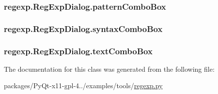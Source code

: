 \subsubsection[{pattern\+Combo\+Box}]{\setlength{\rightskip}{0pt plus 5cm}regexp.\+Reg\+Exp\+Dialog.\+pattern\+Combo\+Box}\label{classregexp_1_1RegExpDialog_a50d7f5a4ded544a783e2c38ad4d79d31}
\hypertarget{classregexp_1_1RegExpDialog_a79e05ca94ff124c94d55e2bb5cc48657}{}
\subsubsection[{syntax\+Combo\+Box}]{\setlength{\rightskip}{0pt plus 5cm}regexp.\+Reg\+Exp\+Dialog.\+syntax\+Combo\+Box}\label{classregexp_1_1RegExpDialog_a79e05ca94ff124c94d55e2bb5cc48657}
\hypertarget{classregexp_1_1RegExpDialog_a611d550fdfb30444ed1c1d5f3af4ada2}{}
\subsubsection[{text\+Combo\+Box}]{\setlength{\rightskip}{0pt plus 5cm}regexp.\+Reg\+Exp\+Dialog.\+text\+Combo\+Box}\label{classregexp_1_1RegExpDialog_a611d550fdfb30444ed1c1d5f3af4ada2}


The documentation for this class was generated from the following file\+:\begin{DoxyCompactItemize}
\item 
packages/\+Py\+Qt-\/x11-\/gpl-\/4../examples/tools/\hyperlink{regexp_8py}{regexp.\+py}\end{DoxyCompactItemize}
